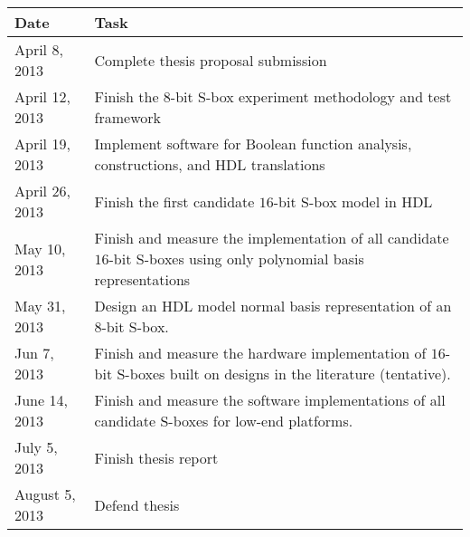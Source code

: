 \begin{center}
\begin{tabular}{ l | p{8cm} }
  Date & Task \\ \hline
  April 8, 2013 & Complete thesis proposal submission \\
  April 12, 2013 & Finish the 8-bit S-box experiment methodology and test framework \\
  April 19, 2013 & Implement software for Boolean function analysis, constructions, and HDL translations \\
  April 26, 2013 & Finish the first candidate $16$-bit S-box model in HDL \\
  May 10, 2013 & Finish and measure the implementation of all candidate $16$-bit S-boxes using only polynomial basis representations \\
  May 31, 2013 & Design an HDL model normal basis representation of an $8$-bit S-box. \\
  Jun 7, 2013 & Finish and measure the hardware implementation of $16$-bit S-boxes built on designs in the literature (tentative). \\
  June 14, 2013 & Finish and measure the software implementations of all candidate S-boxes for low-end platforms. \\
  July 5, 2013 & Finish thesis report \\
  August 5, 2013 & Defend thesis
\end{tabular}
\end{center}